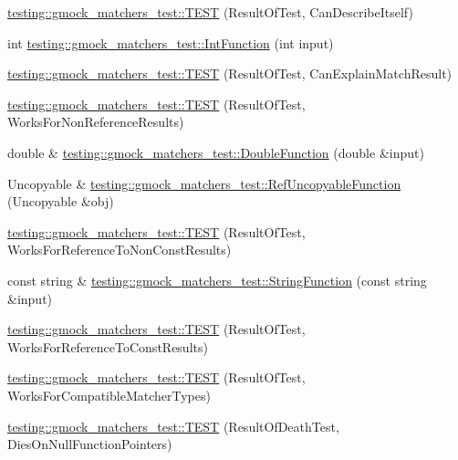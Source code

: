 \begin{DoxyCompactItemize}
\item 
\hyperlink{namespacetesting_1_1gmock__matchers__test_a1b5240d2272b679d7e3035554c2c5688}{testing\+::gmock\+\_\+matchers\+\_\+test\+::\+T\+E\+ST} (Result\+Of\+Test, Can\+Describe\+Itself)
\item 
int \hyperlink{namespacetesting_1_1gmock__matchers__test_a6e957b9dcda1186c6274a8895d1514b5}{testing\+::gmock\+\_\+matchers\+\_\+test\+::\+Int\+Function} (int input)
\item 
\hyperlink{namespacetesting_1_1gmock__matchers__test_ab7fe283b2955ca8bb11b2984a08eef33}{testing\+::gmock\+\_\+matchers\+\_\+test\+::\+T\+E\+ST} (Result\+Of\+Test, Can\+Explain\+Match\+Result)
\item 
\hyperlink{namespacetesting_1_1gmock__matchers__test_a86f01e29ee48050d401fceca21d1041e}{testing\+::gmock\+\_\+matchers\+\_\+test\+::\+T\+E\+ST} (Result\+Of\+Test, Works\+For\+Non\+Reference\+Results)
\item 
double \& \hyperlink{namespacetesting_1_1gmock__matchers__test_a48350ba4c1ce65694ec07e9c1c49a452}{testing\+::gmock\+\_\+matchers\+\_\+test\+::\+Double\+Function} (double \&input)
\item 
Uncopyable \& \hyperlink{namespacetesting_1_1gmock__matchers__test_aa6f7dd285163d5880cfd6685bec8cab4}{testing\+::gmock\+\_\+matchers\+\_\+test\+::\+Ref\+Uncopyable\+Function} (Uncopyable \&obj)
\item 
\hyperlink{namespacetesting_1_1gmock__matchers__test_a505e866c4066d27854cb6754c66a3eec}{testing\+::gmock\+\_\+matchers\+\_\+test\+::\+T\+E\+ST} (Result\+Of\+Test, Works\+For\+Reference\+To\+Non\+Const\+Results)
\item 
const string \& \hyperlink{namespacetesting_1_1gmock__matchers__test_a5fdf1ecaf8e8e8ef5d57c311e675841d}{testing\+::gmock\+\_\+matchers\+\_\+test\+::\+String\+Function} (const string \&input)
\item 
\hyperlink{namespacetesting_1_1gmock__matchers__test_a17b952cce22be6338fb1369f886d61c4}{testing\+::gmock\+\_\+matchers\+\_\+test\+::\+T\+E\+ST} (Result\+Of\+Test, Works\+For\+Reference\+To\+Const\+Results)
\item 
\hyperlink{namespacetesting_1_1gmock__matchers__test_a1aceb307c843f0f5532053e390a7c654}{testing\+::gmock\+\_\+matchers\+\_\+test\+::\+T\+E\+ST} (Result\+Of\+Test, Works\+For\+Compatible\+Matcher\+Types)
\item 
\hyperlink{namespacetesting_1_1gmock__matchers__test_a4c929e5b46a503a9bb48c8b88dcbbf2a}{testing\+::gmock\+\_\+matchers\+\_\+test\+::\+T\+E\+ST} (Result\+Of\+Death\+Test, Dies\+On\+Null\+Function\+Pointers)

\end{DoxyCompactItemize}
